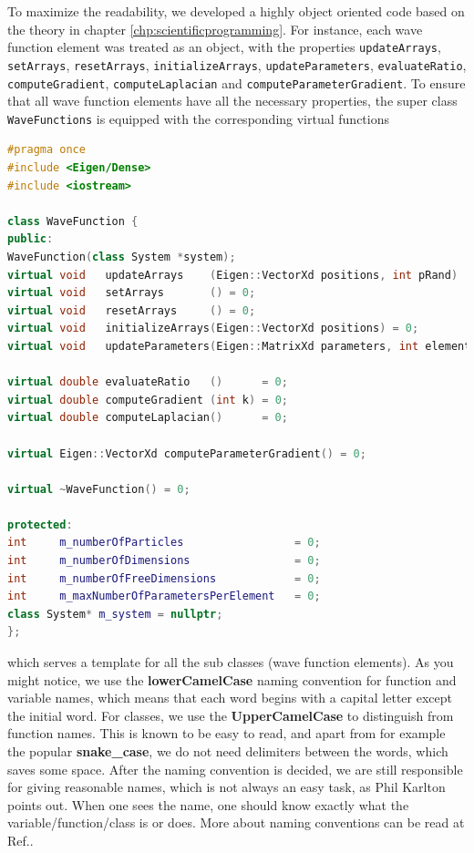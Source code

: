To maximize the readability, we developed a highly object oriented code based on the theory in chapter \eqref{chp:scientificprogramming}. For instance, each wave function element was treated as an object, with the properties \texttt{updateArrays}, \texttt{setArrays}, \texttt{resetArrays}, \texttt{initializeArrays}, \texttt{updateParameters}, \texttt{evaluateRatio}, \texttt{computeGradient}, \texttt{computeLaplacian} and \newline\texttt{computeParameterGradient}. To ensure that all wave function elements have all the necessary properties, the super class \texttt{WaveFunctions} is equipped with the corresponding virtual functions
\lstset{basicstyle=\scriptsize}
\begin{lstlisting}[language=c++,caption={\texttt{wavefunction.h}}]
#pragma once
#include <Eigen/Dense>
#include <iostream>

class WaveFunction {
public:
WaveFunction(class System *system);
virtual void   updateArrays    (Eigen::VectorXd positions, int pRand)  = 0;
virtual void   setArrays       () = 0;
virtual void   resetArrays     () = 0;
virtual void   initializeArrays(Eigen::VectorXd positions) = 0;
virtual void   updateParameters(Eigen::MatrixXd parameters, int elementNumber) = 0;

virtual double evaluateRatio   ()      = 0;
virtual double computeGradient (int k) = 0;
virtual double computeLaplacian()      = 0;

virtual Eigen::VectorXd computeParameterGradient() = 0;

virtual ~WaveFunction() = 0;

protected:
int     m_numberOfParticles                 = 0;
int     m_numberOfDimensions                = 0;
int     m_numberOfFreeDimensions            = 0;
int     m_maxNumberOfParametersPerElement   = 0;
class System* m_system = nullptr;
};
\end{lstlisting}
which serves a template for all the sub classes (wave function elements). As you might notice, we use the \textbf{lowerCamelCase} naming convention for function and variable names, which means that each word begins with a capital letter except the initial word. For classes, we use the \textbf{UpperCamelCase} to distinguish from function names. This is known to be easy to read, and apart from for example the popular \textbf{snake\_case}, we do not need delimiters between the words, which saves some space. After the naming convention is decided, we are still responsible for giving reasonable names, which is not always an easy task, as Phil Karlton points out. When one sees the name, one should know exactly what the variable/function/class is or does. More about naming conventions can be read at Ref.\cite{noauthor_naming_2019}.

